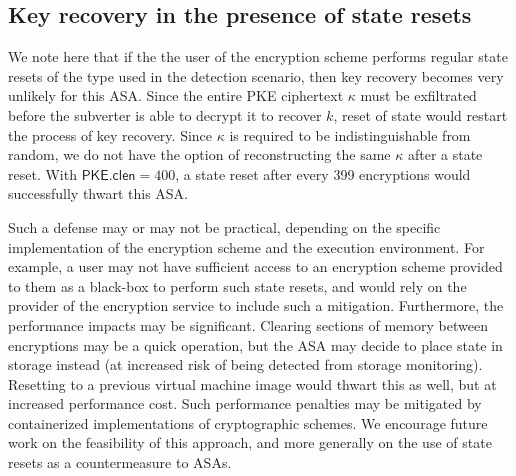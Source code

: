 \subsection{Key recovery in the presence of state resets}
We note here that if the the user of the encryption scheme performs regular state resets of the type used in the detection scenario, then key recovery becomes very unlikely for this ASA. Since the entire \textsf{PKE} ciphertext $\kappa$ must be exfiltrated before the subverter is able to decrypt it to recover $k$, reset of state would restart the process of key recovery. Since $\kappa$ is required to be indistinguishable from random, we do not have the option of reconstructing the same $\kappa$ after a state reset. With $\mathsf{PKE.clen}=400$, a state reset after every 399 encryptions would successfully thwart this ASA.

Such a defense may or may not be practical, depending on the specific implementation of the encryption scheme and the execution environment. For example, a user may not have sufficient access to an encryption scheme provided to them as a black-box to perform such state resets, and would rely on the provider of the encryption service to include such a mitigation. Furthermore, the performance impacts may be significant. Clearing sections of memory between encryptions may be a quick operation, but the ASA may decide to place state in storage instead (at increased risk of being detected from storage monitoring). Resetting to a previous virtual machine image would thwart this as well, but at increased performance cost. Such performance penalties may be mitigated by containerized implementations of cryptographic schemes. We encourage future work on the feasibility of this approach, and more generally on the use of state resets as a countermeasure to ASAs.

